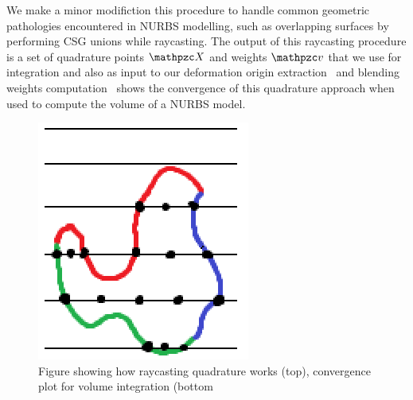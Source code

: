 We make a minor modifiction this procedure to handle common geometric pathologies encountered in NURBS modelling, such as overlapping surfaces by performing 
CSG unions while raycasting. 
The output of this raycasting procedure is a set of quadrature points $\st{X}$ and weights $\st{v}$ that we use for integration and also as input to our 
deformation origin extraction~ and blending weights computation~
 shows the convergence of this quadrature approach when used to compute the volume of a NURBS model.
\begin{figure}
    \includegraphics[width=\columnwidth]{figures/raycasting_quadrature}
    \caption{Figure showing how raycasting quadrature works (top), convergence plot for volume integration (bottom}
    \label{fig:raycasting}
\end{figure}

